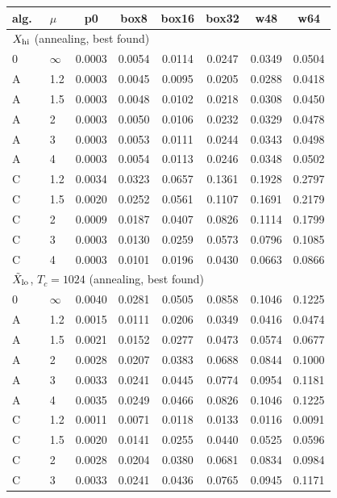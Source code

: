 \documentclass{article}
\numberwithin{equation}{section}   %
\begin{document}
\begin{table}[ht]
\centering\small
\begin{tabular}{ll cccccc}
\toprule
alg.\ & $\mu$ & p0 & box8 & box16 & box32 & w48 & w64 \\
\midrule
\multicolumn{8}{l}{$X_{\rm hi}$ (annealing, best found)} \\
0 & $\infty$ & 0.0003 & 0.0054 & 0.0114 & 0.0247 & 0.0349 & 0.0504 \\
A & 1.2 & 0.0003 & 0.0045 & 0.0095 & 0.0205 & 0.0288 & 0.0418 \\
A & 1.5 & 0.0003 & 0.0048 & 0.0102 & 0.0218 & 0.0308 & 0.0450 \\
A & 2   & 0.0003 & 0.0050 & 0.0106 & 0.0232 & 0.0329 & 0.0478 \\
A & 3   & 0.0003 & 0.0053 & 0.0111 & 0.0244 & 0.0343 & 0.0498 \\
A & 4   & 0.0003 & 0.0054 & 0.0113 & 0.0246 & 0.0348 & 0.0502 \\
C & 1.2 & 0.0034 & 0.0323 & 0.0657 & 0.1361 & 0.1928 & 0.2797 \\
C & 1.5 & 0.0020 & 0.0252 & 0.0561 & 0.1107 & 0.1691 & 0.2179 \\
C & 2   & 0.0009 & 0.0187 & 0.0407 & 0.0826 & 0.1114 & 0.1799 \\
C & 3   & 0.0003 & 0.0130 & 0.0259 & 0.0573 & 0.0796 & 0.1085 \\
C & 4   & 0.0003 & 0.0101 & 0.0196 & 0.0430 & 0.0663 & 0.0866 \\
\midrule
\multicolumn{8}{l}{$\tilde X_{\rm lo}$, $T_c = 1024$ (annealing, best found)} \\
0 & $\infty$ & 0.0040 & 0.0281 & 0.0505 & 0.0858 & 0.1046 & 0.1225 \\
A & 1.2 & 0.0015 & 0.0111 & 0.0206 & 0.0349 & 0.0416 & 0.0474 \\
A & 1.5 & 0.0021 & 0.0152 & 0.0277 & 0.0473 & 0.0574 & 0.0677 \\
A & 2   & 0.0028 & 0.0207 & 0.0383 & 0.0688 & 0.0844 & 0.1000 \\
A & 3   & 0.0033 & 0.0241 & 0.0445 & 0.0774 & 0.0954 & 0.1181 \\
A & 4   & 0.0035 & 0.0249 & 0.0466 & 0.0826 & 0.1046 & 0.1225 \\
C & 1.2 & 0.0011 & 0.0071 & 0.0118 & 0.0133 & 0.0116 & 0.0091 \\
C & 1.5 & 0.0020 & 0.0141 & 0.0255 & 0.0440 & 0.0525 & 0.0596 \\
C & 2   & 0.0028 & 0.0204 & 0.0380 & 0.0681 & 0.0834 & 0.0984 \\
C & 3   & 0.0033 & 0.0241 & 0.0436 & 0.0765 & 0.0945 & 0.1171 \\

\end{tabular}
\end{table}
\end{document}

